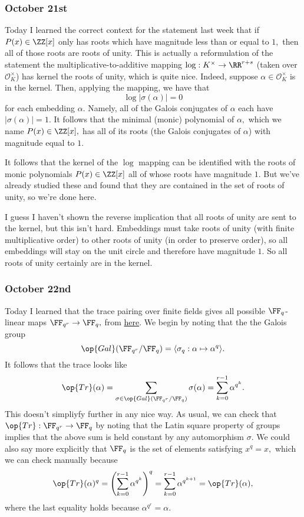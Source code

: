 \subsubsection{October 21st}
Today I learned the correct context for the statement last week that if $P(x)\in\ZZ[x]$ only has roots which have magnitude less than or equal to $1,$ then all of those roots are roots of unity. This is actually a reformulation of the statement the multiplicative-to-additive mapping $\log:K^\times\to\RR^{r+s}$ (taken over $\mathcal O_K^\times$) has kernel the roots of unity, which is quite nice. Indeed, suppose $\alpha\in\mathcal O_K^\times$ is in the kernel. Then, applying the mapping, we have that
\[\log|\sigma(\alpha)|=0\]
for each embedding $\alpha.$ Namely, all of the Galois conjugates of $\alpha$ each have $|\sigma(\alpha)|=1.$ It follows that the minimal (monic) polynomial of $\alpha,$ which we name $P(x)\in\ZZ[x],$ has all of its roots (the Galois conjugates of $\alpha$) with magnitude equal to $1.$

It follows that the kernel of the $\log$ mapping can be identified with the roots of monic polynomials $P(x)\in\ZZ[x]$ all of whose roots have magnitude $1.$ But we've already studied these and found that they are contained in the set of roots of unity, so we're done here.

I guess I haven't shown the reverse implication that all roots of unity are sent to the kernel, but this isn't hard. Embeddings must take roots of unity (with finite multiplicative order) to other roots of unity (in order to preserve order), so all embeddings will stay on the unit circle and therefore have magnitude $1.$ So all roots of unity certainly are in the kernel.

\subsubsection{October 22nd}
Today I learned that the trace pairing over finite fields gives all possible $\FF_q$-linear maps $\FF_{q^r}\to\FF_q,$ from \href{https://sites.math.rutgers.edu/~sk1233/courses/finitefields-F13/intro.pdf}{here}. We begin by noting that the the Galois group
\[\op{Gal}(\FF_{q^r}/\FF_q)=\langle\sigma_q:\alpha\mapsto\alpha^q\rangle.\]
It follows that the trace looks like
\[\op{Tr}(\alpha)=\sum_{\sigma\in\op{Gal}(\FF_{q^r}/\FF_q)}\sigma(\alpha)=\sum_{k=0}^{r-1}\alpha^{q^k}.\]
This doesn't simpliyfy further in any nice way. As usual, we can check that $\op{Tr}:\FF_{q^r}\to\FF_q$ by noting that the Latin square property of groups implies that the above sum is held constant by any automorphism $\sigma.$ We could also say more explicitly that $\FF_q$ is the set of elements satisfying $x^q=x,$ which we can check manually because
\[\op{Tr}(\alpha)^q=\left(\sum_{k=0}^{r-1}\alpha^{q^k}\right)^q=\sum_{k=0}^{r-1}\alpha^{q^{k+1}}=\op{Tr}(\alpha),\]
where the last equality holds because $\alpha^{q^r}=\alpha.$

